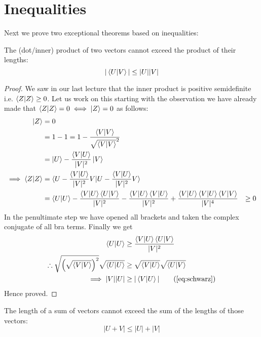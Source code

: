\documentclass[english,seminar,headertitle]{lecture}
\begin{document}
\section{Inequalities}

Next we prove two exceptional theorems based on inequalities:

\begin{theorem}
	The (dot/inner) product of two vectors cannot exceed the product of their lengths:
	\begin{equation}
		|\braket{U | V}| \le |U||V| \label{eq:schwarz}
	\end{equation}%
\end{theorem}

\begin{proof}
	We saw in our last lecture that the inner product is positive semidefinite i.e. $\braket{Z|Z} \ge 0$. Let us work on this starting with the observation we have already made that $\braket{Z|Z} = 0 \iff \ket{Z} = 0$ as follows:
	\begin{align*}
		\ket{Z} &= 0 \\
				&= 1-1 = 1-{\braket{V|V}\over\sqrt{\braket{V|V}}^2} \\
				&= \ket{U} - {\braket{V|U}\over|V|^2}\ket{V} \\
\implies\braket{Z|Z} &= \braket{U - {\braket{V|U}\over |V|^2} V | U - {\braket{V|U}\over|V|^2} V} \\
				&= \braket{U|U} - {\braket{V|U}\braket{U|V}\over|V|^2} - {\braket{V|U}\braket{V|U}\over|V|^2} + {\braket{V|U}\braket{V|U}\braket{V|V}\over|V|^4}
				&\ge 0
	\end{align*}
	In the penultimate step we have opened all brackets and taken the complex conjugate of all bra terms. Finally we get
	\begin{align*}
		\braket{U|U} &\ge {\braket{V|U}\braket{U|V}\over|V|^2} \\ 
\therefore \sqrt{\left(\sqrt{\braket{V|V}}\right)^2} \sqrt{\braket{U|U}} &\ge \sqrt{\braket{V|U}}\sqrt{\braket{U|V}} \\
\implies |V||U| &\ge |\braket{V|U}| \tag{\ref{eq:schwarz}}
	\end{align*}
	Hence proved.
\end{proof}

\begin{theorem}
	The length of a sum of vectors cannot exceed the sum of the lengths of those vectors:
	\begin{equation}
		|U + V| \le |U| + |V| \label{eq:triangle}
	\end{equation}%
\end{theorem}
\end{document}
